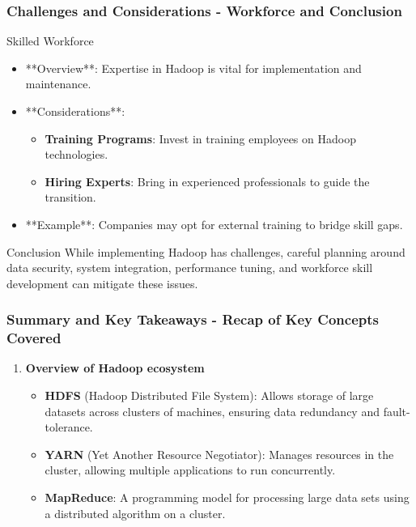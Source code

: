 \documentclass[aspectratio=169]{beamer}
\begin{document}
\begin{frame}[fragile]
    \frametitle{Challenges and Considerations - Workforce and Conclusion}
    \begin{block}{Skilled Workforce}
        \begin{itemize}
            \item **Overview**: Expertise in Hadoop is vital for implementation and maintenance.
            \item **Considerations**:
                \begin{itemize}
                    \item \textbf{Training Programs}: Invest in training employees on Hadoop technologies.
                    \item \textbf{Hiring Experts}: Bring in experienced professionals to guide the transition.
                \end{itemize}
            \item **Example**: Companies may opt for external training to bridge skill gaps.
        \end{itemize}
    \end{block}

    \begin{block}{Conclusion}
        While implementing Hadoop has challenges, careful planning around data security, system integration, performance tuning, and workforce skill development can mitigate these issues.
    \end{block}
\end{frame}

\begin{frame}[fragile]
    \frametitle{Summary and Key Takeaways - Recap of Key Concepts Covered}
    
    \begin{enumerate}
        \item \textbf{Overview of Hadoop ecosystem}
        \begin{itemize}
            \item \textbf{HDFS} (Hadoop Distributed File System): 
            Allows storage of large datasets across clusters of machines, ensuring data redundancy and fault-tolerance.
            
            \item \textbf{YARN} (Yet Another Resource Negotiator): 
            Manages resources in the cluster, allowing multiple applications to run concurrently.
            
            \item \textbf{MapReduce}: 
            A programming model for processing large data sets using a distributed algorithm on a cluster.
        \end{itemize}
    \end{enumerate}
    
\end{frame}
\end{document}
